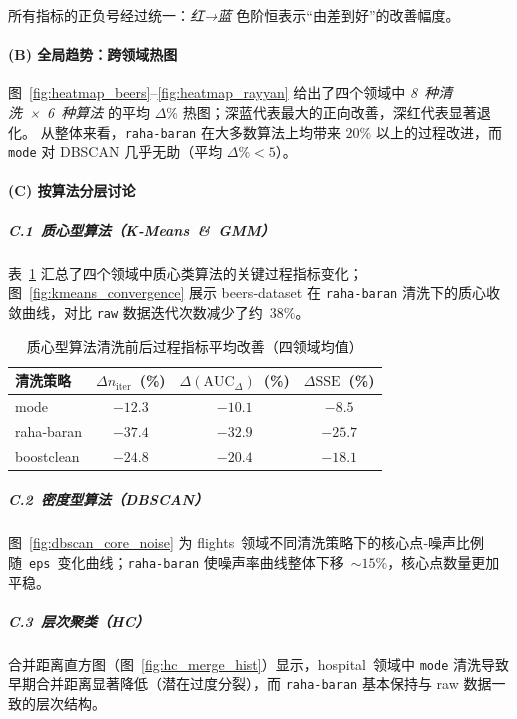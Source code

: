 \documentclass[10pt]{article} %
\numberwithin{equation}{section}
\begin{document}
\vspace{0.5em}
\noindent
所有指标的正负号经过统一：\emph{红→蓝} 色阶恒表示“由差到好”的改善幅度。

\paragraph{(B) 全局趋势：跨领域热图}
图 \ref{fig:heatmap_beers}--\ref{fig:heatmap_rayyan} 给出了四个领域中 \emph{8 种清洗 × 6 种算法} 的平均 $\Delta\%$ 热图；深蓝代表最大的正向改善，深红代表显著退化。  
从整体来看，\texttt{raha‑baran} 在大多数算法上均带来 $20\%$ 以上的过程改进，而 \texttt{mode} 对 DBSCAN 几乎无助（平均 $\Delta\%<5$）。

\paragraph{(C) 按算法分层讨论}

\subparagraph{C.1 质心型算法（K‑Means \& GMM）}
表 \ref{tab:kmeans_gmm_summary} 汇总了四个领域中质心类算法的关键过程指标变化；图 \ref{fig:kmeans_convergence} 展示 beers‑dataset 在 \texttt{raha‑baran} 清洗下的质心收敛曲线，对比 \texttt{raw} 数据迭代次数减少了约 $38\%$。

\begin{table}[htbp]
  \centering
  \caption{质心型算法清洗前后过程指标平均改善（四领域均值）}
  \label{tab:kmeans_gmm_summary}
  \begin{tabular}{lccc}
  \toprule
  清洗策略 & $\Delta n_{\text{iter}}$ (\%) & $\Delta(\text{AUC}_\Delta)$ (\%) & $\Delta\text{SSE}$ (\%)\\
  \midrule
  mode          & $-12.3$ & $-10.1$ & $-8.5$\\
  raha‑baran    & $\mathbf{-37.4}$ & $\mathbf{-32.9}$ & $\mathbf{-25.7}$\\
  boostclean    & $-24.8$ & $-20.4$ & $-18.1$\\
  \bottomrule
  \end{tabular}
\end{table}

\subparagraph{C.2 密度型算法（DBSCAN）}
图 \ref{fig:dbscan_core_noise} 为 flights 领域不同清洗策略下的核心点‑噪声比例随 \texttt{eps} 变化曲线；\texttt{raha‑baran} 使噪声率曲线整体下移 $\sim\!15\%$，核心点数量更加平稳。

\subparagraph{C.3 层次聚类（HC）}
合并距离直方图（图 \ref{fig:hc_merge_hist}）显示，hospital 领域中 \texttt{mode} 清洗导致早期合并距离显著降低（潜在过度分裂），而 \texttt{raha‑baran} 基本保持与 raw 数据一致的层次结构。
\end{document}
